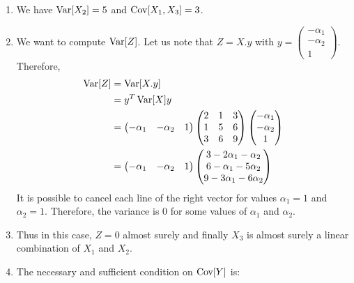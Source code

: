 \begin{solution}
  \begin{enumerate}
    \item We have $\operatorname{Var}[X_2] = 5$ and $\operatorname{Cov}[X_1, X_3] = 3$.
    \item We want to compute $\operatorname{Var}[Z]$. Let us note that $Z = X . y$ with $y = \begin{pmatrix} -\alpha_1 \\ -\alpha_2 \\ 1 \end{pmatrix}$. Therefore,
          \begin{align*}
            \operatorname{Var}[Z] & = \operatorname{Var}[X.y]      \\
                    & = y^T \operatorname{Var}[X] y  \\
                    & =
            \begin{pmatrix}
              -\alpha_1 & -\alpha_2 & 1
            \end{pmatrix}
            \begin{pmatrix}
              2 & 1 & 3 \\
              1 & 5 & 6 \\
              3 & 6 & 9
            \end{pmatrix}
            \begin{pmatrix}
              -\alpha_1 \\ -\alpha_2 \\ 1
            \end{pmatrix} \\
                    & =
            \begin{pmatrix}
              -\alpha_1 & -\alpha_2 & 1
            \end{pmatrix}
            \begin{pmatrix}
              3-2\alpha_1-\alpha_2 \\ 6-\alpha_1-5\alpha_2 \\ 9-3\alpha_1-6\alpha_2
            \end{pmatrix}
          \end{align*}
          It is possible to cancel each line of the right vector for values $\alpha_1 = 1$ and $\alpha_2 = 1$. Therefore, the variance is $0$ for some values of $\alpha_1$ and $\alpha_2$.
    \item Thus in this case, $Z = 0$ almost surely and finally $X_3$ is almost surely a linear combination of $X_1$ and $X_2$.
    \item The necessary and sufficient condition on $\operatorname{Cov}[Y]$ is:

\end{enumerate}
\end{solution}
